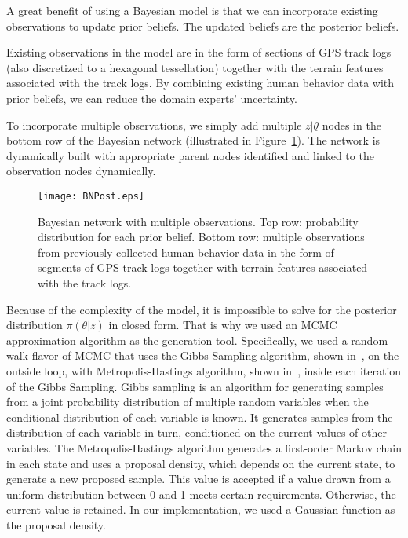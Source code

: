 A great benefit of using a Bayesian model is that we can incorporate existing observations to update prior beliefs. The updated beliefs are the posterior beliefs.

Existing observations in the model are in the form of sections of GPS track logs (also discretized to a hexagonal tessellation) together with the terrain features associated with the track logs. By combining existing human behavior data with prior beliefs, we can reduce the domain experts' uncertainty.

To incorporate multiple observations, we simply add multiple $z|\underline{\theta}$ nodes in the bottom row of the Bayesian network (illustrated in Figure~\ref{BNPost}). The network is dynamically built with appropriate parent nodes identified and linked to the observation nodes dynamically.
\begin{figure}
\centering
\texttt{[image: BNPost.eps]}
\caption{Bayesian network with multiple observations. Top row: probability distribution for each prior belief. Bottom row: multiple observations from previously collected human behavior data in the form of segments of GPS track logs together with terrain features associated with the track logs.}
\label{BNPost}
\end{figure}

Because of the complexity of the model, it is impossible to solve for the posterior distribution $\pi(\underline{\theta}|\underline{z})$ in closed form. That is why we used an MCMC approximation algorithm as the generation tool. Specifically, we used a random walk flavor of MCMC that uses the Gibbs Sampling algorithm, shown in~\cite{Gelman2004Bayesian}, on the outside loop, with Metropolis-Hastings algorithm, shown in~\cite{Gelman2004Bayesian}, inside each iteration of the Gibbs Sampling. Gibbs sampling is an algorithm for generating samples from a joint probability distribution of multiple random variables when the conditional distribution of each variable is known. It generates samples from the distribution of each variable in turn, conditioned on the current values of other variables. The Metropolis-Hastings algorithm generates a first-order Markov chain in each state and uses a proposal density, which depends on the current state, to generate a new proposed sample. This value is accepted if a value drawn from a uniform distribution between 0 and 1 meets certain requirements. Otherwise, the current value is retained. In our implementation, we used a Gaussian function as the proposal density.

